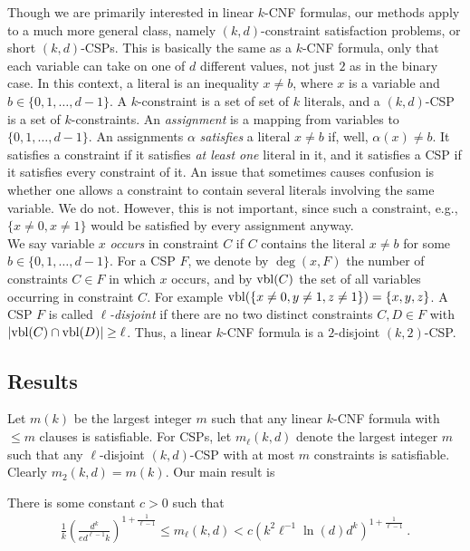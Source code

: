 \documentclass[envcountsect, envcountsame]{llncs}
\newcommand{\vbl}{\ensuremath{{\rm vbl}}}
\begin{document}
Though we are primarily interested in linear $k$-CNF formulas, our
methods apply to a much more general class, namely $(k,d)$-constraint
satisfaction problems, or short $(k,d)$-CSPs. This is basically the
same as a $k$-CNF formula, only that each variable can take on one
of $d$ different values, not just $2$ as in the binary case.  In this
context, a literal is an inequality $x \ne b$, where $x$ is a variable
and $b \in \{0,1,\dots,d-1\}$. A $k$-constraint is a set of set of $k$
literals, and a $(k,d)$-CSP is a set of $k$-constraints.  An {\em
  assignment} is a mapping from variables to $\{0,1,\dots,d-1\}$.  An
assignments $\alpha$ {\em satisfies} a literal $x \ne b$ if, well,
$\alpha(x) \ne b$. It satisfies a constraint if it satisfies {\em at
  least one} literal in it, and it satisfies a CSP if it satisfies
every constraint of it. An issue that sometimes causes confusion is
whether one allows a constraint to contain several literals involving
the same variable. We do not. However, this is not important, since
such a constraint, e.g., $\{x \ne 0, x \ne 1\}$ would be satisfied by
every assignment anyway. \\

We say variable $x$ {\em occurs} in constraint $C$ if $C$ contains the
literal $x \ne b$ for some $b \in \{0,1,\dots,d-1\}$. For a CSP $F$,
we denote by $\deg(x,F)$ the number of constraints $C \in F$ in which
$x$ occurs, and by $\vbl(C)$ the set of all variables occurring in
constraint $C$. For example $\vbl( \{x \ne 0, y \ne 1, z \ne 1\}) =
\{x,y,z\}$. A CSP $F$ is called {\em $\ell$-disjoint} if there are no
two distinct constraints $C, D \in F$ with $|\vbl(C) \cap \vbl(D)|
\geq \ell$.  Thus, a linear $k$-CNF formula is a $2$-disjoint
$(k,2)$-CSP.

\subsection{Results}

Let $m(k)$ be the largest integer $m$ such that any linear $k$-CNF
formula with $\leq m$ clauses is satisfiable.  For CSPs, let
$m_\ell(k,d)$ denote the largest integer $m$ such that any
$\ell$-disjoint $(k,d)$-CSP with at most $m$ constraints is
satisfiable. Clearly $m_2(k,d) = m(k)$. Our main result is

\begin{theorem}
  There is some constant $c > 0$ such that
  \begin{eqnarray}
    \frac{1}{k} \left(\frac{d^k}{ed^{\ell -1}k}\right)^{1+\frac{1}{\ell -1}}
    \leq m_{\ell}(k,d) < 
    c \left(k^2\ell^{-1}\ln(d)d^k\right)^{1+\frac{1}{\ell -1}} \ .
  \end{eqnarray}
\label{main-result}
\end{theorem}
\end{document}
